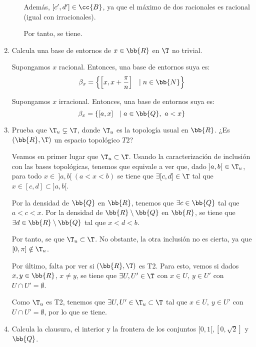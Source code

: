 \begin{ejercicio}
\begin{enumerate}[label=\alph*)]
\begin{enumerate}
            Además, $[c', d']\in \cc{B}$, ya que el máximo de dos racionales es racional (igual con irracionales).

            Por tanto, se tiene.
        \end{enumerate}

        \item Calcula una base de entornos de $x\in \bb{R}$ en $\T$ no trivial.

        Supongamos $x$ racional. Entonces, una base de entornos suya es:
        \begin{equation*}
            \beta_x=\left\{\left[x,x+\frac{\pi}{n}\right]~~ \mid n\in \bb{N}\right\}
        \end{equation*}

        Supongamos $x$ irracional. Entonces, una base de entornos suya es:
        \begin{equation*}
            \beta_x=\left\{\left[a,x\right]~~ \mid a\in \bb{Q},~a<x\right\}
        \end{equation*}

        \item Prueba que $\T_u\subsetneq \T$, donde $\T_u$ es la topología usual en $\bb{R}$. ¿Es $(\bb{R},\T)$ un espacio topológico $T2$?


        Veamos en primer lugar que $\T_u\subset \T$. Usando la caracterización de inclusión con las bases topológicas, tenemos que equivale a ver que, dado $]a,b[~\in \T_u$, para todo $x\in~ ]a,b[~ (a<x<b)$ se tiene que $\exists [c,d]\in \T$ tal que $x\in [c,d]\subset ]a,b[$.

        Por la densidad de $\bb{Q}$ en $\bb{R}$, tenemos que $\exists c\in \bb{Q}$ tal que $a<c<x$. Por la densidad de $\bb{R}\setminus\bb{Q}$ en $\bb{R}$, se tiene que $\exists d\in \bb{R}\setminus\bb{Q}$ tal que $x<d<b$.
        
        Por tanto, se que $\T_u\subset \T$. No obstante, la otra inclusión no es cierta, ya que $[0,\pi]\notin \T_u$.


        Por último, falta por ver si $(\bb{R},\T)$ es T2. Para esto, vemos si dados $x,y\in \bb{R}$, $x\neq y$, se tiene que $\exists U,U'\in \T$ con $x\in U,~ y\in U'$ con $U\cap U'=\emptyset$.

        Como $\T_u$ es T2, tenemos que $\exists U,U'\in \T_u\subset \T$ tal que $x\in U,~ y\in U'$ con $U\cap U'=\emptyset$, por lo que se tiene.
        

        \item Calcula la clausura, el interior y la frontera de los conjuntos $[0,1[, [0,\sqrt{2}]$ y $\bb{Q}$.


\end{enumerate}
\end{ejercicio}
